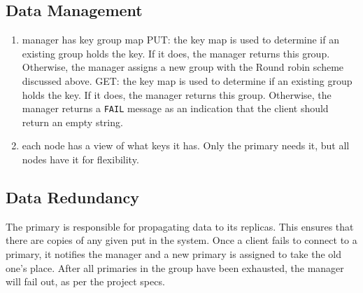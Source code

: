 \documentclass{article}
\begin{document}
\subsection{Data Management}
\begin{enumerate}
    \item manager has key group map
        \subitem PUT: the key map is used to determine if an existing group holds the key. If it does, the manager returns this group. Otherwise, the manager assigns a new group
        with the Round robin scheme discussed above.
        \subitem GET: the key map is used to determine if an existing group holds the key. If it does, the manager returns this group. Otherwise, the manager returns a \texttt{FAIL}
        message as an indication that the client should return an empty string.
    \item each node has a view of what keys it has. Only the primary needs it, but all nodes have it for flexibility.
\end{enumerate}
\subsection{Data Redundancy}
The primary is responsible for propagating data to its replicas. This ensures that there are copies of any given put in the system. Once a client fails to connect to a primary,
it notifies the manager and a new primary is assigned to take the old one's place. After all primaries in the group have been exhausted, the manager will fail out, as per the project
specs. 
\end{document}
